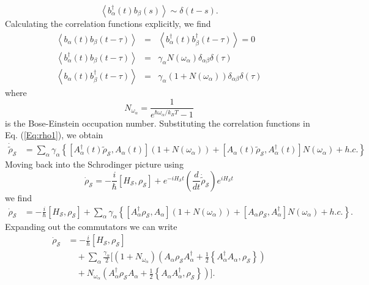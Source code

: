 %
\begin{equation}
\left\langle b_\alpha^{\dagger}(t) b_\beta(s) \right\rangle \sim \delta(t-s).
\end{equation}
%
Calculating the correlation functions explicitly, we find
\begin{eqnarray}
\left\langle b_\alpha(t) b_\beta(t-\tau) \right\rangle & = & \left\langle b_\alpha^\dagger(t) b_\beta^\dagger(t-\tau) \right\rangle = 0 \\
\left\langle b_\alpha^\dagger(t) b_\beta(t-\tau) \right\rangle & = & \gamma_\alpha N( \omega_\alpha ) \delta_{\alpha \beta} \delta(\tau) \\
\left\langle b_\alpha(t) b_\beta^\dagger(t-\tau) \right\rangle & = & \gamma_\alpha (1+N( \omega_\alpha )) \delta_{\alpha \beta} \delta(\tau) 
\end{eqnarray}
where 
\begin{equation}
N_\omega_{\alpha} = \frac{1}{e^{\hbar\omega_{\alpha}/k_B T} - 1}
\end{equation}
is the Bose-Einstein occupation number. Substituting the correlation functions in Eq. (\ref{Eq:rho1}), we obtain
\begin{align}
\dot{\tilde{\rho}}_{\mathcal{S}} & =  \sum_{\alpha } \gamma_\alpha \left\lbrace \left[  A_{\alpha}^\dagger(t) \tilde{\rho}_{\mathcal{S}} , A_\alpha(t)   \right] \left( 1 + N(\omega_\alpha) \right) + \left[  A_{\alpha}(t) \tilde{\rho}_{\mathcal{S}} , A_\alpha^\dagger(t)   \right] N( \omega_\alpha ) + h.c. \right\rbrace \nonumber
\end{align} 
Moving back into the Schrodinger picture using
\begin{equation}
 \dot{\rho}_{\mathcal{S}} = -\frac{i}{\hbar} [H_{\mathcal{S}}, \rho_{\mathcal{S}} ] + e^{-i H_{\mathcal{S}} t} \left( \frac{d}{d t } \dot{\tilde{\rho}}_{\mathcal{S}} \right) e^{ i H_{\mathcal{S}} t }
\end{equation}
we find
\begin{align}
\dot{\rho}_{\mathcal{S}} & = -\frac{i}{\hbar}[H_{\mathcal{S}}, \rho_{\mathcal{S}}] + \sum_{\alpha} \gamma_\alpha \left\lbrace \left[  A_{\alpha}^\dagger \rho_{\mathcal{S}} , A_\alpha   \right] \left( 1 + N(\omega_\alpha) \right) + \left[  A_{\alpha} \rho_{\mathcal{S}} , A_\alpha^\dagger   \right] N( \omega_\alpha ) + h.c. \right\rbrace . \nonumber
\end{align} 
Expanding out the commutators we can write 
\begin{align}\label{Effective_dynamics}
\dot{\rho}_{\mathcal{S}} & = - \frac{i}{\hbar} [H_{\mathcal{S}}, \rho_{\mathcal{S}} ] \\
& \quad +  \sum_{\alpha } \frac{\gamma_\alpha}{2} \biggl[ (1 + N_{\omega_\alpha} ) \left( A_\alpha \rho_{\mathcal{S}} A_\alpha^\dagger + \frac{1}{2} \left\lbrace A_\alpha^\dagger A_\alpha , \rho_{\mathcal{S}} \right\rbrace \right) \nonumber\\
& \quad +  N_{\omega_\alpha}  \left( A_\alpha^\dagger \rho_{\mathcal{S}} A_\alpha +\frac{1}{2} \left\lbrace A_\alpha A_\alpha^\dagger , \rho_{\mathcal{S}} \right\rbrace \right)\biggr]. \nonumber
\end{align} 
